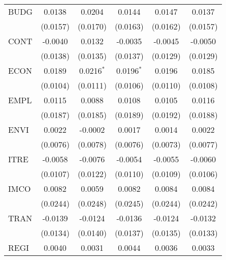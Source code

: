 \begin{tabular}{lccccc}
   BUDG                                & 0.0138        & 0.0204       & 0.0144        & 0.0147        & 0.0137\\   
                                       & (0.0157)      & (0.0170)     & (0.0163)      & (0.0162)      & (0.0157)\\   
   CONT                                & -0.0040       & 0.0132       & -0.0035       & -0.0045       & -0.0050\\   
                                       & (0.0138)      & (0.0135)     & (0.0137)      & (0.0129)      & (0.0129)\\   
   ECON                                & 0.0189        & 0.0216$^{*}$ & 0.0196$^{*}$  & 0.0196        & 0.0185\\   
                                       & (0.0104)      & (0.0111)     & (0.0106)      & (0.0110)      & (0.0108)\\   
   EMPL                                & 0.0115        & 0.0088       & 0.0108        & 0.0105        & 0.0116\\   
                                       & (0.0187)      & (0.0185)     & (0.0189)      & (0.0192)      & (0.0188)\\   
   ENVI                                & 0.0022        & -0.0002      & 0.0017        & 0.0014        & 0.0022\\   
                                       & (0.0076)      & (0.0078)     & (0.0076)      & (0.0073)      & (0.0077)\\   
   ITRE                                & -0.0058       & -0.0076      & -0.0054       & -0.0055       & -0.0060\\   
                                       & (0.0107)      & (0.0122)     & (0.0110)      & (0.0109)      & (0.0106)\\   
   IMCO                                & 0.0082        & 0.0059       & 0.0082        & 0.0084        & 0.0084\\   
                                       & (0.0244)      & (0.0248)     & (0.0245)      & (0.0244)      & (0.0242)\\   
   TRAN                                & -0.0139       & -0.0124      & -0.0136       & -0.0124       & -0.0132\\   
                                       & (0.0134)      & (0.0140)     & (0.0137)      & (0.0135)      & (0.0133)\\   
   REGI                                & 0.0040        & 0.0031       & 0.0044        & 0.0036        & 0.0033\\   

\end{tabular}
